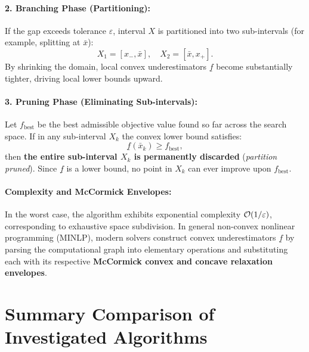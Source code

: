 \paragraph{2. Branching Phase (Partitioning):}
If the gap exceeds tolerance $\varepsilon$, interval $X$ is partitioned into two sub-intervals (for example, splitting at $\bar{x}$):
\begin{equation}
    X_1 = [x_-, \bar{x}], \quad X_2 = [\bar{x}, x_+].
\end{equation}
By shrinking the domain, local convex underestimators $\underline{f}$ become substantially tighter, driving local lower bounds upward.

\paragraph{3. Pruning Phase (Eliminating Sub-intervals):}
Let $f_{\text{best}}$ be the best admissible objective value found so far across the search space.
If in any sub-interval $X_k$ the convex lower bound satisfies:
\begin{equation}
    \underline{f}(\bar{x}_k) \ge f_{\text{best}},
    \label{eq:pruning-condition-sbb-en}
\end{equation}
then \textbf{the entire sub-interval $X_k$ is permanently discarded} (\textit{partition pruned}). Since $\underline{f}$ is a lower bound, no point in $X_k$ can ever improve upon $f_{\text{best}}$.

\paragraph{Complexity and McCormick Envelopes:}
In the worst case, the algorithm exhibits exponential complexity $\mathcal{O}\!\left(1/\varepsilon\right)$, corresponding to exhaustive space subdivision.
In general non-convex nonlinear programming (MINLP), modern solvers construct convex underestimators $\underline{f}$ by parsing the computational graph into elementary operations and substituting each with its respective \textbf{McCormick convex and concave relaxation envelopes}.

\FloatBarrier
\section{Summary Comparison of Investigated Algorithms}
\label{sec:univariate-summary-comparison-en}


